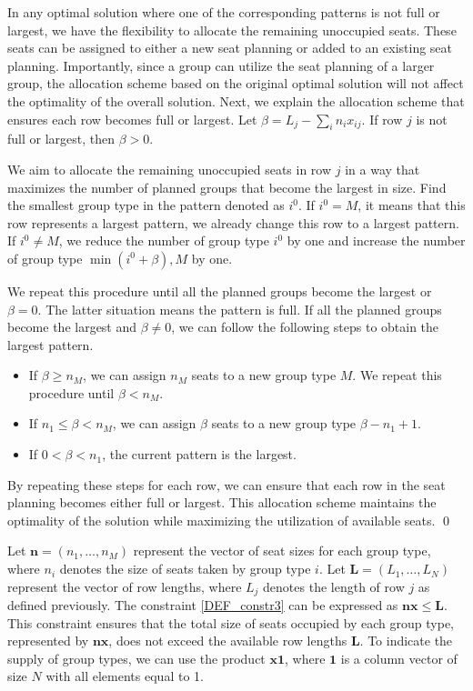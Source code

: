 \begin{pf}
In any optimal solution where one of the corresponding patterns is not full or largest, we have the flexibility to allocate the remaining unoccupied seats. These seats can be assigned to either a new seat planning or added to an existing seat planning. Importantly, since a group can utilize the seat planning of a larger group, the allocation scheme based on the original optimal solution will not affect the optimality of the overall solution. Next, we explain the allocation scheme that ensures each row becomes full or largest. Let $\beta= L_{j} - \sum_{i} n_{i} x_{ij}$. If row $j$ is not full or largest, then $\beta > 0$. 

We aim to allocate the remaining unoccupied seats in row $j$ in a way that maximizes the number of planned groups that become the largest in size.
Find the smallest group type in the pattern denoted as $i^0$. If $i^0 = M$, it means that this row represents a largest pattern, we already change this row to a largest pattern. If $i^0 \neq M$, we reduce the number of group type $i^0$ by one and increase the number of group type $\min {(i^0+\beta), M}$ by one. 

We repeat this procedure until all the planned groups become the largest or $\beta = 0$. The latter situation means the pattern is full. If all the planned groups become the largest and $\beta \neq 0$, we can follow the following steps to obtain the largest pattern.

\begin{itemize}
  \item If $\beta \geq n_{M}$, we can assign $n_M$ seats to a new group type $M$. We repeat this procedure until $\beta < n_{M}$. 
  \item If $n_{1} \leq \beta < n_{M}$, we can assign $\beta$ seats to a new group type $\beta-n_{1}+1$.
  \item If $0 < \beta < n_{1}$, the current pattern is the largest.
\end{itemize}

By repeating these steps for each row, we can ensure that each row in the seat planning becomes either full or largest. This allocation scheme maintains the optimality of the solution while maximizing the utilization of available seats. \qed
\end{pf}

Let $\mathbf{n} = (n_1, \ldots, n_M)$ represent the vector of seat sizes for each group type, where $n_i$ denotes the size of seats taken by group type $i$. Let $\mathbf{L} = (L_1, \ldots, L_N)$ represent the vector of row lengths, where $L_j$ denotes the length of row $j$ as defined previously.
The constraint \eqref{DEF_constr3} can be expressed as $\mathbf{n} \mathbf{x} \leq \mathbf{L}$. This constraint ensures that the total size of seats occupied by each group type, represented by $\mathbf{n} \mathbf{x}$, does not exceed the available row lengths $\mathbf{L}$.
To indicate the supply of group types, we can use the product $\mathbf{x} \mathbf{1}$, where $\mathbf{1}$ is a column vector of size $N$ with all elements equal to 1. 

